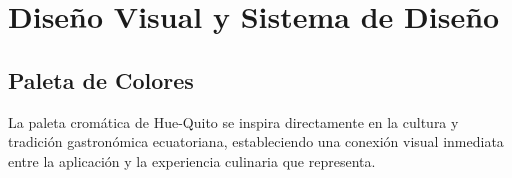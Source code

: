 \documentclass[11pt, a4paper, oneside]{report}
\begin{document}
\chapter{Diseño Visual y Sistema de Diseño}

\section{Paleta de Colores}

La paleta cromática de Hue-Quito se inspira directamente en la cultura y tradición gastronómica ecuatoriana, estableciendo una conexión visual inmediata entre la aplicación y la experiencia culinaria que representa.
\end{document}
